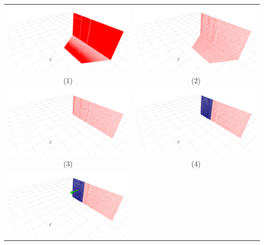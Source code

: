 
\label{annexe:suivi_mur}
\newlength{\savedtabcolsep}
\setlength{\savedtabcolsep}{\tabcolsep}
\setlength{\tabcolsep}{0pt}
\begin{tabular}{cc}
  \includegraphics[width=0.5\linewidth]{images/pcl/Selection_060} &
  \includegraphics[width=0.5\linewidth]{images/pcl/Selection_061} \\
  (1) & (2) \\
  \includegraphics[width=0.5\linewidth]{images/pcl/Selection_062} &
  \includegraphics[width=0.5\linewidth]{images/pcl/Selection_063} \\
  (3) & (4) \\
  \includegraphics[width=0.5\linewidth]{images/pcl/Selection_064} &

\end{tabular}
